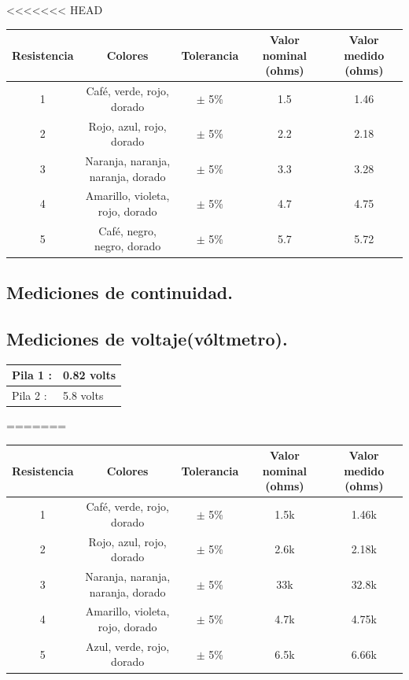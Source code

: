 \documentclass[10pt]{article}
\begin{document}
\begin{multicols}{2}
<<<<<<< HEAD
\begin{adjustbox}{width=\textwidth}
	\begin{tabular}{|c|c|c|c|c|}
		\hline
		Resistencia & Colores & Tolerancia & Valor nominal (ohms) & Valor medido (ohms) \\
		\hline
		1 & Café, verde, rojo, dorado & $\pm$ 5\% & 1.5 & 1.46 \\
		\hline
		2 & Rojo, azul, rojo, dorado & $\pm$ 5\% & 2.2 & 2.18 \\
		\hline
		3 & Naranja, naranja, naranja, dorado & $\pm$ 5\% & 3.3 & 3.28 \\
		\hline
		4 & Amarillo, violeta, rojo, dorado & $\pm$ 5\% & 4.7 & 4.75 \\
		\hline
		5 & Café, negro, negro, dorado & $\pm$ 5\% & 5.7 & 5.72 \\
		\hline
	\end{tabular}
\end{adjustbox}

\subsection{Mediciones de continuidad.}

\subsection{Mediciones de voltaje(vóltmetro).}
\begin{tabular}{ p{4cm} p{3cm} }
	\hline
	Pila 1 : & 0.82 volts \\
	\hline
	Pila 2 : & 5.8 volts \\
	\hline
\end{tabular}
=======
\begin{center}
	\begin{adjustbox}{width=245pt}
		\begin{tabular}{|c|c|c|c|c|}
			\hline
			Resistencia & Colores & Tolerancia & Valor nominal (ohms) & Valor medido (ohms) \\
			\hline
			1 & Café, verde, rojo, dorado & $\pm$ 5\% & 1.5k & 1.46k \\
			\hline
			2 & Rojo, azul, rojo, dorado & $\pm$ 5\% & 2.6k & 2.18k \\
			\hline
			3 & Naranja, naranja, naranja, dorado & $\pm$ 5\% & 33k & 32.8k \\
			\hline
			4 & Amarillo, violeta, rojo, dorado & $\pm$ 5\% & 4.7k & 4.75k \\
			\hline
			5 & Azul, verde, rojo, dorado & $\pm$ 5\% & 6.5k & 6.66k \\
			\hline
		\end{tabular}
	\end{adjustbox}
\end{center}


\end{multicols}
\end{document}
